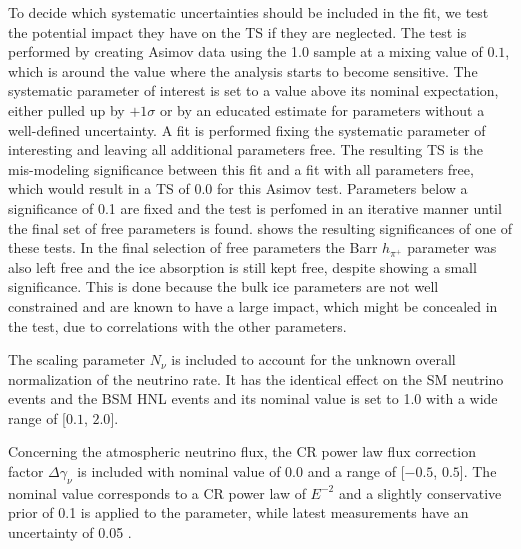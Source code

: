 To decide which systematic uncertainties should be included in the fit, we test the potential impact they have on the TS if they are neglected. The test is performed by creating Asimov data using the \SI{1.0}{\gev} sample at a mixing value of $0.1$, which is around the value where the analysis starts to become sensitive. The systematic parameter of interest is set to a value above its nominal expectation, either pulled up by $+1\sigma$ or by an educated estimate for parameters without a well-defined uncertainty. A fit is performed fixing the systematic parameter of interesting and leaving all additional parameters free. The resulting TS is the mis-modeling significance between this fit and a fit with all parameters free, which would result in a TS of 0.0 for this Asimov test. Parameters below a significance of \SI{0.1}{\sigma} are fixed and the test is perfomed in an iterative manner until the final set of free parameters is found.  shows the resulting significances of one of these tests. In the final selection of free parameters the Barr $h_{\pi^+}$ parameter was also left free and the ice absorption is still kept free, despite showing a small significance. This is done because the bulk ice parameters are not well constrained and are known to have a large impact, which might be concealed in the test, due to correlations with the other parameters.

The scaling parameter $N_{\nu}$ is included to account for the unknown overall normalization of the neutrino rate. It has the identical effect on the SM neutrino events and the BSM HNL events and its nominal value is set to 1.0 with a wide range of [$0.1$, $2.0$].

Concerning the atmospheric neutrino flux, the CR power law flux correction factor $\Delta \gamma_\nu$ is included with nominal value of 0.0 and a range of [$-0.5$, $0.5$]. The nominal value corresponds to a CR power law of $E^{-2}$ and a slightly conservative prior of 0.1 is applied to the parameter, while latest measurements have an uncertainty of 0.05 .

